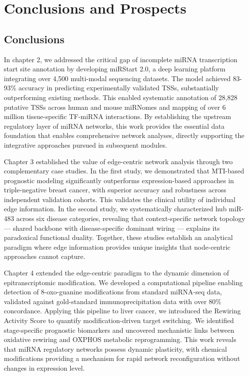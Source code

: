 \chapter{Conclusions and Prospects}
\label{chp:conclusions-and-prospects}

\section{Conclusions}

In chapter 2, we addressed the critical gap of incomplete miRNA transcription start site annotation by developing miRStart 2.0, a deep learning platform integrating over 4,500 multi-modal sequencing datasets. The model achieved 83-93\% accuracy in predicting experimentally validated TSSs, substantially outperforming existing methods. This enabled systematic annotation of 28,828 putative TSSs across human and mouse miRNomes and mapping of over 6 million tissue-specific TF-miRNA interactions. By establishing the upstream regulatory layer of miRNA networks, this work provides the essential data foundation that enables comprehensive network analyses, directly supporting the integrative approaches pursued in subsequent modules.

Chapter 3 established the value of edge-centric network analysis through two complementary case studies. In the first study, we demonstrated that MTI-based prognostic modeling significantly outperforms expression-based approaches in triple-negative breast cancer, with superior accuracy and robustness across independent validation cohorts. This validates the clinical utility of individual edge information. In the second study, we systematically characterized hub miR-483 across six disease categories, revealing that context-specific network topology --- shared backbone with disease-specific dominant wiring --- explains its paradoxical functional duality. Together, these studies establish an analytical paradigm where edge information provides unique insights that node-centric approaches cannot capture.

Chapter 4 extended the edge-centric paradigm to the dynamic dimension of epitranscriptomic modification. We developed a computational pipeline enabling detection of 8-oxo-guanine modifications from standard miRNA-seq data, validated against gold-standard immunoprecipitation data with over 80\% concordance. Applying this pipeline to liver cancer, we introduced the Rewiring Activity Score to quantify modification-driven target switching. We identified stage-specific prognostic biomarkers and uncovered mechanistic links between oxidative rewiring and OXPHOS metabolic reprogramming. This work reveals that miRNA regulatory networks possess dynamic plasticity, with chemical modifications providing a mechanism for rapid network reconfiguration without changes in expression level.

